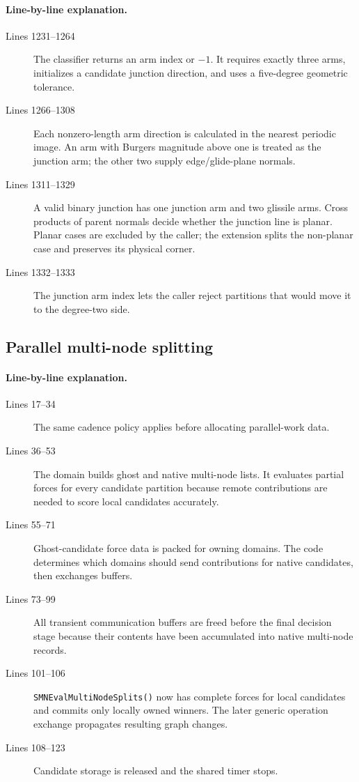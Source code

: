 \documentclass[11pt]{article}
\newcommand{\code}[1]{\texorpdfstring{\nolinkurl{#1}}{#1}}
\begin{document}
\paragraph{Line-by-line explanation.}
\begin{description}
\item[Lines 1231--1264] The classifier returns an arm index or \(-1\). It
requires exactly three arms, initializes a candidate junction direction, and
uses a five-degree geometric tolerance.
\item[Lines 1266--1308] Each nonzero-length arm direction is calculated in
the nearest periodic image. An arm with Burgers magnitude above one is treated
as the junction arm; the other two supply edge/glide-plane normals.
\item[Lines 1311--1329] A valid binary junction has one junction arm and two
glissile arms. Cross products of parent normals decide whether the junction
line is planar. Planar cases are excluded by the caller; the extension splits
the non-planar case and preserves its physical corner.
\item[Lines 1332--1333] The junction arm index lets the caller reject
partitions that would move it to the degree-two side.
\end{description}

\subsection{Parallel multi-node splitting}



\paragraph{Line-by-line explanation.}
\begin{description}
\item[Lines 17--34] The same cadence policy applies before allocating
parallel-work data.
\item[Lines 36--53] The domain builds ghost and native multi-node lists. It
evaluates partial forces for every candidate partition because remote
contributions are needed to score local candidates accurately.
\item[Lines 55--71] Ghost-candidate force data is packed for owning domains.
The code determines which domains should send contributions for native
candidates, then exchanges buffers.
\item[Lines 73--99] All transient communication buffers are freed before the
final decision stage because their contents have been accumulated into native
multi-node records.
\item[Lines 101--106] \code{SMNEvalMultiNodeSplits()} now has complete forces
for local candidates and commits only locally owned winners. The later generic
operation exchange propagates resulting graph changes.
\item[Lines 108--123] Candidate storage is released and the shared timer
stops.
\end{description}
\end{document}
